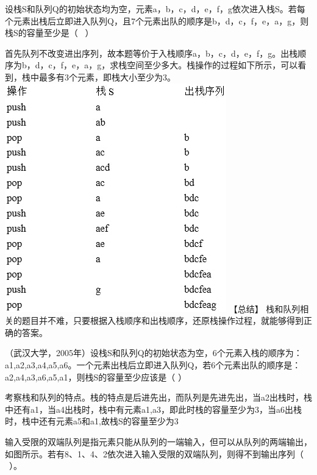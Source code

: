\question 设栈S和队列Q的初始状态均为空，元素a，b，c，d，e，f，g依次进入栈S。若每个元素出栈后立即进入队列Q，且7个元素出队的顺序是b，d，c，f，e，a，g，则栈S的容量至少是（
~）
\par{}
\begin{solution}首先队列不改变进出序列，故本题等价于入栈顺序a，b，c，d，e，f，g。出栈顺序为b，d，c，f，e，a，g，求栈空间至少多大。栈操作的过程如下所示，可以看到，栈中最多有3个元素，即栈大小至少为3。
\includegraphics[width=3.78125in,height=3.90625in]{computerassets/13bba34f34f8765d413e9d53bfddf745.jpeg}
【总结】
栈和队列相关的题目并不难，只要根据入栈顺序和出栈顺序，还原栈操作过程，就能够得到正确的答案。
\end{solution}
\question （武汉大学，2005年）设栈S和队列Q的初始状态为空，6个元素入栈的顺序为：a1,a2,a3,a4,a5,a6。一个元素出栈后立即进入队列Q，若6个元素出队的顺序是：a2,a4,a3,a6,a5,a1，则栈S的容量至少应该是（
）
\par{}
\begin{solution}考察栈和队列的特点。栈的特点是后进先出，而队列是先进先出，当a2出栈时，栈中还有a1，当a4出栈时，栈中有元素a1,a3，即此时栈的容量至少为3，当a6出栈时，栈中还有元素a5和a1,故栈S的容量至少为3
\end{solution}
\question 输入受限的双端队列是指元素只能从队列的一端输入，但可以从队列的两端输出，如图所示。若有8、1、4、2依次进入输入受限的双端队列，则得不到输出序列（
~）。~

